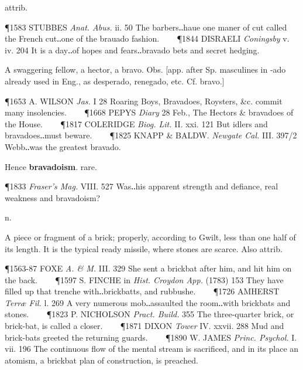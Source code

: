 \begin{description}[wide, labelwidth=!, labelindent=0pt]
\begin{myenumerate}
 attrib.

\P 1583 STUBBES  \textit{Anat. Abus.} ii. 50 The barbers‥haue one maner of cut called the French cut‥one of the brauado fashion.    
\P 1844 DISRAELI  \textit{Coningsby} v. iv. 204 It is a day‥of hopes and fears‥bravado bets and secret hedging.

 A swaggering fellow, a hector, a bravo. Obs. [app. after Sp. masculines in -ado already used in Eng., as desperado, renegado, etc. Cf. bravo.]

\P 1653 A. WILSON  \textit{Jas.} I 28 Roaring Boys, Bravadoes, Roysters, \&c. commit many insolencies.    
\P 1668 PEPYS  \textit{Diary} 28 Feb., The Hectors \& bravadoes of the House.    
\P 1817 COLERIDGE  \textit{Biog. Lit.} II. xxi. 121 But idlers and bravadoes‥must beware.    
\P 1825 KNAPP \& BALDW. \textit{Newgate Cal.} III. 397/2 Webb‥was the greatest bravado.

\vspace{0.1cm} \noindent
Hence \textbf{bravadoism}. rare.

\P 1833  \textit{Fraser's Mag.} VIII. 527 Was‥his apparent strength and defiance, real weakness and bravadoism?
\end{myenumerate}


 n.

\noindent {}

\vspace{-0.3cm}

\begin{myenumerate}

 A piece or fragment of a brick; properly, according to Gwilt, less than one half of its length. It is the typical ready missile, where stones are scarce. Also attrib.

\P 1563-87 FOXE  \textit{A. \& M.} III. 329 She sent a brickbat after him, and hit him on the back.    
\P 1597 S. FINCHE in \textit{Hist. Croydon App.} (1783) 153 They have filled up that trenche with‥brickbatts, and rubbushe.    
\P 1726 AMHERST  \textit{Terræ Fil.} l. 269 A very numerous mob‥assaulted the room‥with brickbats and stones.    
\P 1823 P. NICHOLSON  \textit{Pract. Build.} 355 The three-quarter brick, or brick-bat, is called a closer.    
\P 1871 DIXON  \textit{Tower} IV. xxvii. 288 Mud and brick-bats greeted the returning guards.    
\P 1890 W. JAMES  \textit{Princ. Psychol.} I. vii. 196 The continuous flow of the mental stream is sacrificed, and in its place an atomism, a brickbat plan of construction, is preached.


\end{myenumerate}
\end{description}

